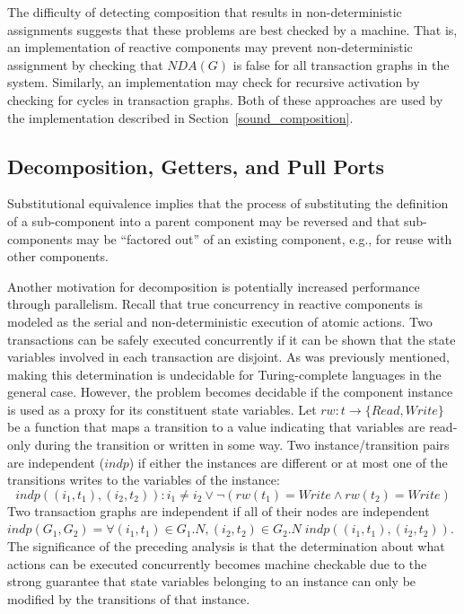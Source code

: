 The difficulty of detecting composition that results in non-deterministic assignments suggests that these problems are best checked by a machine.
That is, an implementation of reactive components may prevent non-deterministic assignment by checking that $\mathit{NDA}(G)$ is false for all transaction graphs in the system.
Similarly, an implementation may check for recursive activation by checking for cycles in transaction graphs.
Both of these approaches are used by the implementation described in Section~\ref{sound_composition}.

\subsection{Decomposition, Getters, and Pull Ports}
\label{decomposition}
Substitutional equivalence implies that the process of substituting the definition of a sub-component into a parent component may be reversed and that sub-components may be ``factored out'' of an existing component, e.g., for reuse with other components.

Another motivation for decomposition is potentially increased performance through parallelism.
Recall that true concurrency in reactive components is modeled as the serial and non-deterministic execution of atomic actions.
Two transactions can be safely executed concurrently if it can be shown that the state variables involved in each transaction are disjoint.
As was previously mentioned, making this determination is undecidable for Turing-complete languages in the general case.
However, the problem becomes decidable if the component instance is used as a proxy for its constituent state variables.
Let $\mathit{rw}: t \to \{ \mathit{Read}, \mathit{Write} \}$ be a function that maps a transition to a value indicating that variables are read-only during the transition or written in some way.
Two instance/transition pairs are independent ($\mathit{indp}$) if either the instances are different or at most one of the transitions writes to the variables of the instance:
\begin{equation}
\mathit{indp}((i_1, t_1), (i_2, t_2)): i_1 \ne i_2 \lor \lnot (\mathit{rw}(t_1) = \mathit{Write} \land \mathit{rw}(t_2) = \mathit{Write})
\end{equation}
Two transaction graphs are independent if all of their nodes are independent $\mathit{indp}(G_1, G_2) = \forall (i_1, t_1) \in G_1.N, (i_2, t_2) \in G_2.N \; \mathit{indp}((i_1, t_1), (i_2, t_2))$.
The significance of the preceding analysis is that the determination about what actions can be executed concurrently becomes machine checkable due to the strong guarantee that state variables belonging to an instance can only be modified by the transitions of that instance.


